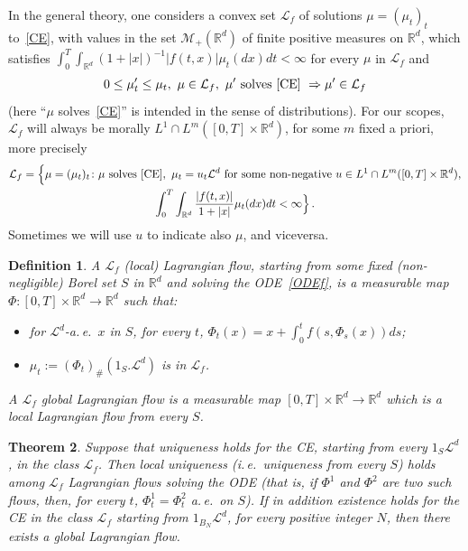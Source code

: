 \documentclass[a4paper,10pt]{article}
\newtheorem{theorem}{Theorem}
\newtheorem{definition}[theorem]{Definition}
\newcommand{\mr}{\mathbb{R}}
\newcommand{\mc}{\mathcal}
\begin{document}
In the general theory, one considers a convex set $\mc{L}_f$ of solutions $\mu=(\mu_t)_t$ to~\eqref{CE}, with values in the set $\mc{M}_+(\mr^d)$ of finite positive measures on $\mr^d$, which satisfies $\int^T_0\int_{\mr^d} (1+|x|)^{-1} |f(t,x)| \mu_t(dx)dt< \infty$ for every $\mu$ in $\mc{L}_f$ and
\begin{equation}
0\le\mu'_t\le\mu_t,\ \mu\in\mc{L}_f,\ \mu'\mbox{ solves~\eqref{CE} }\Rightarrow\mu'\in\mc{L}_f\label{condLb}
\end{equation}
(here ``$\mu$ solves~\eqref{CE}'' is intended in the sense of distributions). For our scopes, $\mc{L}_f$ will always be morally $L^1\cap L^m([0,T]\times\mr^d)$, for some $m$ fixed a priori, more precisely
\begin{multline*}
\mc{L}_f=\Big\{\mu=(\mu_t)_t \colon \mu\mbox{ solves~\eqref{CE}},\ \mu_t=u_t\mc{L}^d \text{ for some non-negative } u\in L^1\cap L^m([0,T]\times\mr^d), \\ \int^T_0\int_{\mr^d}\frac{|f(t,x)|}{1+|x|}\mu_t(dx)dt< \infty \Big\} \, .
\end{multline*}
Sometimes we will use $u$ to indicate also $\mu$, and viceversa.

\begin{definition}
A $\mc{L}_f$ (local) Lagrangian flow, starting from some fixed (non-negligible) Borel set $S$ in $\mr^d$ and solving the ODE~\eqref{ODEf}, is a measurable map $\Phi \colon [0,T]\times\mr^d\rightarrow\mr^d$ such that:
\begin{itemize}
\item for $\mc{L}^d$-a.\,e.\ $x$ in $S$, for every $t$, $\Phi_t(x)=x+\int^t_0f(s,\Phi_s(x))ds$;
\item $\mu_t:=(\Phi_t)_\#(1_{S}.\mc{L}^d)$ is in $\mc{L}_f$.
\end{itemize}
A $\mc{L}_f$ global Lagrangian flow is a measurable map $[0,T]\times\mr^d\rightarrow\mr^d$ which is a local Lagrangian flow from every $S$.
\end{definition}

\begin{theorem}\label{Lagrthm}
Suppose that uniqueness holds for the CE, starting from every $1_S \mc{L}^d$, in the class $\mc{L}_f$. Then local uniqueness (i.\,e.\ uniqueness from every $S$) holds among $\mc{L}_f$ Lagrangian flows solving the ODE (that is, if $\Phi^1$ and $\Phi^2$ are two such flows, then, for every $t$, $\Phi_t^1=\Phi_t^2$ a.\,e.\ on $S$). If in addition existence holds for the CE in the class $\mc{L}_f$ starting from $1_{B_N} \mc{L}^d$, for every positive integer $N$, then there exists a global Lagrangian flow.
\end{theorem}
\end{document}
